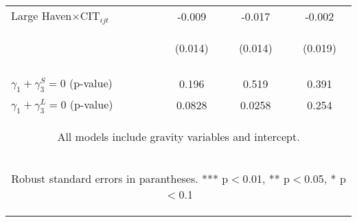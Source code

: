 \begin{center}
\begin{tabular}{lccc}
Large Haven$\times\text{CIT}_{ijt}$ & -0.009 & -0.017 & -0.002 \\
 & \begin{footnotesize}(0.014)\end{footnotesize} & \begin{footnotesize}(0.014)\end{footnotesize} & \begin{footnotesize}(0.019)\end{footnotesize} \\
\vspace{4pt} & \begin{footnotesize}\end{footnotesize} & \begin{footnotesize}\end{footnotesize} & \begin{footnotesize}\end{footnotesize} \\
$\gamma_1+\gamma^S_3 =0$ (p-value) & 0.196 & 0.519 & 0.391 \\
 $\gamma_1+\gamma^L_3 =0$ (p-value) & 0.0828 & 0.0258 & 0.254 \\ \hline
\multicolumn{4}{c}{\begin{footnotesize} All models include gravity variables and intercept.\end{footnotesize}} \\
\multicolumn{4}{c}{\begin{footnotesize} Robust standard errors in parantheses. *** p$<$0.01, ** p$<$0.05, * p$<$0.1\end{footnotesize}} \\
\end{tabular}
\end{center}
